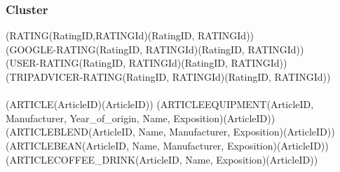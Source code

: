 \subsubsection{Cluster}
(RATING(RatingID,RATINGId)(RatingID, RATINGId))\\
(GOOGLE-RATING(RatingID, RATINGId)(RatingID, RATINGId))\\
(USER-RATING(RatingID, RATINGId)(RatingID, RATINGId))\\
(TRIPADVICER-RATING(RatingID, RATINGId)(RatingID, RATINGId))\\\\
(ARTICLE(ArticleID)(ArticleID))
(ARTICLEEQUIPMENT(ArticleID, Manufacturer, Year\_of\_origin, Name, Exposition)(ArticleID))\\
(ARTICLEBLEND(ArticleID, Name, Manufacturer, Exposition)(ArticleID))\\
(ARTICLEBEAN(ArticleID, Name, Manufacturer, Exposition)(ArticleID))\\
(ARTICLECOFFEE\_DRINK(ArticleID, Name, Exposition)(ArticleID))\\
